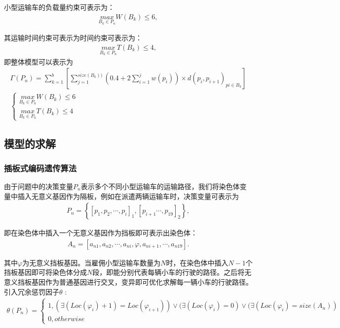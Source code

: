 \documentclass{whutmod}
\begin{document}
小型运输车的负载量约束可表示为：
\begin{gather*}
\underset{B_k\in P_n}{max}  W (B_k) \leqslant 6,
\end{gather*}

其运输时间约束可表示为时间约束可表示为：
\begin{gather*}
\underset{B_k\in P_n}{max}  T (B_k) \leqslant 4,
\end{gather*}
即整体模型可以表示为
\begin{gather}
\Gamma (P_n)=\sum _{k=1}^b[\sum _{j=1}^{size(B_k))}(0.4+2\sum _{i=1}^jw(p_i))\times d(p_i,p_{i+1})_{pi\in B_k}]\\
\left\{\begin{matrix}\underset{B_k\in P_n}{max}  W (B_k) \leqslant 6
\\ \underset{B_k\in P_n}{max}  T (B_k) \leqslant 4
\end{matrix}\right.
\end{gather}
\subsection{模型的求解}
\subsubsection{插板式编码遗传算法}
由于问题中的决策变量$P_n$表示多个不同小型运输车的运输路径，我们将染色体变量中插入无意义基因作为隔板，例如在派遣两辆运输车时，决策变量可表示为
\begin{gather*}
P_n=\left \{[p_{1},p_{2},\cdots,p_{i}]_1,[p_{i+1}\cdots,p_{19}]_{2}\right \},
\end{gather*}

即在染色体中插入一个无意义基因作为挡板即可表示出染色体：
\begin{gather*}
A_n=[a_{n1},a_{n2},\cdots,a_{ni},\varphi ,a_{ni+1},\cdots,a_{n19}].
\end{gather*}

其中$\varphi$为无意义挡板基因。当雇佣小型运输车数量为$N$时，在染色体中插入$N-1$个挡板基因即可将染色体分成$N$段，即能分别代表每辆小车的行驶的路径。之后将无意义挡板基因作为普通基因进行交叉，变异即可优化求解每一辆小车的行驶路径。引入冗余惩罚因子$\theta$ :
\begin{gather}
\theta(P_n)=\left\{\begin{matrix}1,(\exists (Loc(\varphi_i )+1)=Loc(\varphi_{i+1} ))\vee  (\exists (Loc(\varphi_i )=0)\vee (\exists (Loc(\varphi_i )=size(A_n))
\\ 0,otherwise
\end{matrix}\right.
\end{gather}
\end{document}
